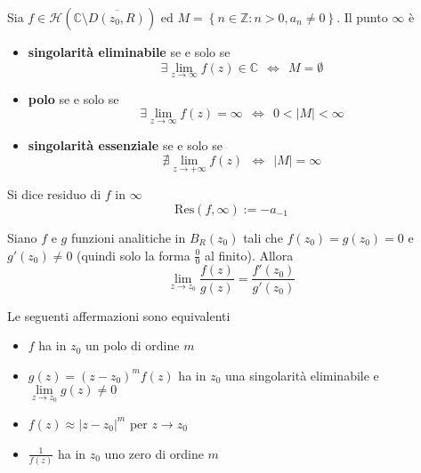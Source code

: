 \begin{thm}
Sia $f\in \mathcal{H}\left(\mathbb{C} \setminus \overline{D\left( z_{0} ,R\right)}\right)$ ed $M=\left\{n\in \mathbb{Z} :n >0,a_{n} \neq 0\right\}$. Il punto $\infty $ è

\begin{itemize}
\item \textbf{singolarità eliminabile} se e solo se\begin{equation*}
\exists \lim\limits _{z\rightarrow \infty } f\left( z\right) \in \mathbb{C} \ \ \iff \ \ M=\emptyset 
\end{equation*}
\item \textbf{polo} se e solo se\begin{equation*}
\exists \lim\limits _{z\rightarrow \infty } f\left( z\right) =\infty \ \ \iff \ \ 0< \left| M\right| < \infty 
\end{equation*}
\item \textbf{singolarità essenziale} se e solo se\begin{equation*}
\nexists \lim\limits _{z\rightarrow +\infty } f\left( z\right) \ \ \iff \ \ \left| M\right| =\infty 
\end{equation*}
\end{itemize}
\end{thm}
\begin{defn}
Si dice residuo di $f$ in $\infty $
\begin{equation*}
\mathrm{Res}\left( f,\infty \right) :=-a_{-1}
\end{equation*}
\end{defn}
\begin{thm}
[di De l'Hôpital] Siano $f$ e $g$ funzioni analitiche in $B_{R}\left( z_{0}\right)$ tali che $f\left( z_{0}\right) =g\left( z_{0}\right) =0$ e $g'\left( z_{0}\right) \neq 0$ (quindi solo la forma $\frac{0}{0}$ al finito). Allora
\begin{equation*}
\lim\limits _{z\rightarrow z_{0}}\frac{f\left( z\right)}{g\left( z\right)} =\frac{f'\left( z_{0}\right)}{g'\left( z_{0}\right)}
\end{equation*}
\end{thm}
\begin{thm}
Le seguenti affermazioni sono equivalenti
\begin{itemize}
\item $f$ ha in $z_{0}$ un polo di ordine $m$
\item $g\left( z\right) =\left( z-z_{0}\right)^{m} f\left( z\right)$ ha in $z_{0}$ una singolarità eliminabile e $\lim\limits _{z\rightarrow z_{0}} g\left( z\right) \neq 0$
\item $f\left( z\right) \approx \left| z-z_{0}\right| ^{m}$ per $z\rightarrow z_{0}$
\item $\frac{1}{f\left( z\right)}$ ha in $z_{0}$ uno zero di ordine $m$
\end{itemize}
\end{thm}
